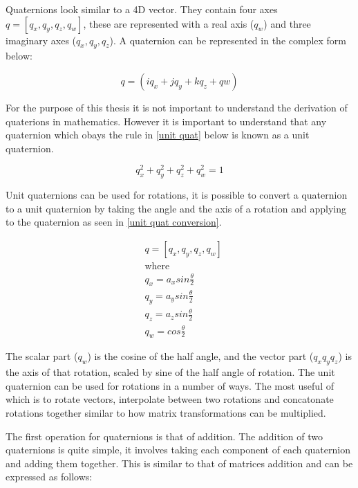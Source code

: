Quaternions look similar to a 4D vector. They contain four axes $q = [q_x, q_y, q_z, q_w]$, these are represented with a real axis ($q_w$) and three imaginary axes ($q_x, q_y, q_z$). A quaternion can be represented in the complex form below: 

\begin{equation}
q = (iq_x + jq_y + kq_z + qw)
\end{equation}

\noindent
For the purpose of this thesis it is not important to understand the derivation of quaterions in mathematics. However it is important to understand that any quaternion which obays the rule in \ref{unit quat} below is known as a unit quaternion.

\begin{equation} \label{unit quat}
	q_x^2 + q_y^2 + q_z^2 + q_w^2 = 1
\end{equation}

\noindent
Unit quaternions can be used for rotations, it is possible to convert a quaternion to a unit quaternion by taking the angle and the axis of a rotation and applying to the quaternion as seen in \ref{unit quat conversion}.

\begin{equation} \label{unit quat conversion}
\begin{aligned}
& q = [q_x, q_y, q_z, q_w]\\
& \text{where} \\
& q_x = a_x sin \frac{\theta}{2}\\
& q_y = a_y sin \frac{\theta}{2}\\
& q_z = a_z sin \frac{\theta}{2}\\
& q_w = cos \frac{\theta}{2}
\end{aligned}
\end{equation}

\noindent
The scalar part ($q_w$) is the cosine of the half angle, and the vector part ($q_x q_y q_z$) is the axis of that rotation, scaled by sine of the half angle of rotation. The unit quaternion can be used for rotations in a number of ways. The most useful of which is to rotate vectors, interpolate between two rotations and concatonate rotations together similar to how matrix transformations can be multiplied.

The first operation for quaternions is that of addition. The addition of two quaternions is quite simple, it involves taking each component of each quaternion and adding them together. This is similar to that of matrices addition and can be expressed as follows:


